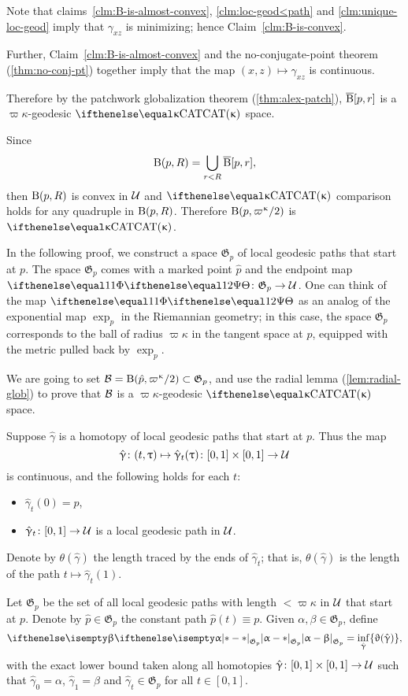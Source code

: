 Note that 
claims~\ref{clm:B-is-almost-convex}, 
\ref{clm:loc-geod<path} 
and \ref{clm:unique-loc-geod}
imply that $\gamma_{x z}$ is minimizing; hence Claim~\ref{clm:B-is-convex}.

Further, Claim~\ref{clm:B-is-almost-convex} and the no-conjugate-point theorem (\ref{thm:no-conj-pt}) together 
imply that the map $(x,z)\mapsto\gamma_{x z}$ is continuous.

Therefore by the patchwork globalization theorem (\ref{thm:alex-patch}), 
$\overline{\mathrm{B}}{}[ p,r]$ is a $\varpi\kappa$-geodesic $\CAT\kappa$ space.

Since
\[\mathrm{B}{}( p,R)
=
\bigcup_{r < R}\overline{\mathrm{B}}{}[ p,r],\] 
then $\mathrm{B}{}( p,R)$ is convex in $\mathcal{U}$ and 
$\CAT\kappa$ comparison holds  for any quadruple in $\mathrm{B}{}( p,R)$.
Therefore $\oBall( p,\varpi\kappa/2)$ is $\CAT\kappa$.
\qeds


In the following proof, we construct a space $\mathfrak{G}_p$ of  local geodesic paths that start at $p$.
The space $\mathfrak{G}_p$ comes with 
a marked point $\hat p$ 
and the endpoint map $\map\:\mathfrak{G}_p\to\spc{U}$.
One can think of
the map $\map$ as an analog of the exponential map $\exp_p$ in the Riemannian geometry;
in this case,
the space $\mathfrak{G}_p$ corresponds to the ball of radius $\varpi\kappa$ in the tangent space at $p$, equipped with the metric pulled back by $\exp_p$.

We are going to set $\spc{B}=\oBall(\hat p,\varpi\kappa/2)\subset \mathfrak{G}_p$,
and use the radial lemma (\ref{lem:radial-glob}) to prove that $\mathcal{B}$ is a $\varpi\kappa$-geodesic $\CAT\kappa$ space.

Suppose $\hat\gamma$ is a homotopy of local geodesic paths that start at $p$.  Thus the map 
\[\hat\gamma\:(t,\tau)\mapsto\hat\gamma_t(\tau)\:[0,1]\times[0,1]\to\spc{U}\] 
is continuous,
and the following holds for each $t$:
\begin{itemize}
\item $\hat\gamma_t(0)=p$,
\item $\hat\gamma_t\:[0,1]\to\spc{U}$ is a local geodesic path in $\mathcal{U}$.
\end{itemize}

Denote by $\theta(\hat\gamma)$ the length traced by the ends of $\hat\gamma_t$;
that is, $\theta(\hat\gamma)$ is the length of the path $t\mapsto\hat\gamma_t(1)$.

Let $\mathfrak{G}_p$ be the set of all local geodesic paths 
with length $<\varpi\kappa$ in $\mathcal{U}$ that start at $p$.
Denote by $\hat p\in \mathfrak{G}_p$ the constant path $\hat p(t)\equiv p$.
Given $\alpha,\beta\in \mathfrak{G}_p$, define
\[
\dist{\alpha}{\beta}{\mathfrak{G}_p}
=
\inf_{\hat\gamma} \{\theta(\hat\gamma)\},\]
with the exact lower bound taken along all homotopies 
$\hat\gamma\:[0,1]\times[0,1]\to\spc{U}$ 
such that 
$\hat\gamma_0=\alpha$, 
$\hat\gamma_1=\beta$ 
and $\hat\gamma_t\in \mathfrak{G}_p$ for all $t\in[0,1]$.

